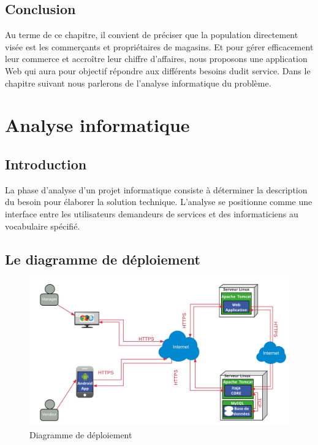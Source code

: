 \documentclass[12pt]{report}
\begin{document}
	
      \section{Conclusion}
      Au terme de ce chapitre, il convient de préciser que la population directement visée est les commerçants et propriétaires de magasins. Et pour gérer efficacement leur commerce et accroître leur chiffre d'affaires, nous proposons une application Web qui aura pour objectif répondre aux différents besoins dudit service. Dans le chapitre suivant nous parlerons de l'analyse informatique du problème.

    \chapter{Analyse informatique}
      \section{Introduction}
	La phase d'analyse d'un projet informatique consiste à déterminer la description du besoin pour élaborer la solution technique. L'analyse se positionne comme une interface entre les utilisateurs demandeurs de services et des informaticiens au vocabulaire spécifié.
	
      \section{Le diagramme de déploiement}
	\begin{figure}[H]
		\begin{center}
		  \includegraphics[scale=0.4]{images/diagrammeDeployement.jpg}
		  \caption{Diagramme de déploiement}
		\end{center}
	  \end{figure}
\end{document}
